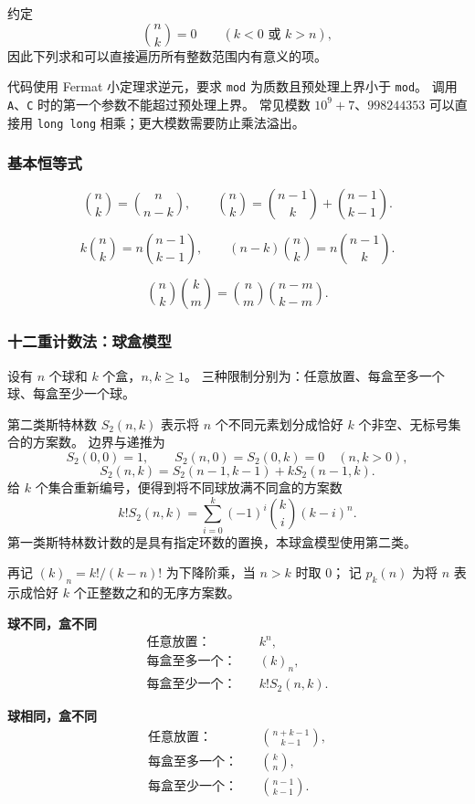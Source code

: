 约定
\[
  \binom{n}{k}=0\qquad(k<0\text{ 或 }k>n),
\]
因此下列求和可以直接遍历所有整数范围内有意义的项。

代码使用 Fermat 小定理求逆元，要求 \texttt{mod} 为质数且预处理上界小于
\texttt{mod}。
调用 \texttt{A}、\texttt{C} 时的第一个参数不能超过预处理上界。
常见模数 $10^9+7$、$998244353$ 可以直接用 \texttt{long long} 相乘；更大模数需要防止乘法溢出。

\subsubsection{基本恒等式}

\[
  \binom{n}{k}=\binom{n}{n-k},
  \qquad
  \binom{n}{k}=\binom{n-1}{k}+\binom{n-1}{k-1}.
\]

\[
  k\binom{n}{k}=n\binom{n-1}{k-1},
  \qquad
  (n-k)\binom{n}{k}=n\binom{n-1}{k}.
\]

\[
  \binom{n}{k}\binom{k}{m}
  =\binom{n}{m}\binom{n-m}{k-m}.
\]

\subsubsection{十二重计数法：球盒模型}

设有 $n$ 个球和 $k$ 个盒，$n,k\ge 1$。
三种限制分别为：任意放置、每盒至多一个球、每盒至少一个球。

第二类斯特林数 $S_2(n,k)$ 表示将 $n$ 个不同元素划分成恰好 $k$ 个非空、无标号集合的方案数。
边界与递推为
\[
  S_2(0,0)=1,
  \qquad
  S_2(n,0)=S_2(0,k)=0\quad(n,k>0),
\]
\[
  S_2(n,k)=S_2(n-1,k-1)+kS_2(n-1,k).
\]
给 $k$ 个集合重新编号，便得到将不同球放满不同盒的方案数
\[
  k!S_2(n,k)
  =\sum_{i=0}^{k}(-1)^i\binom{k}{i}(k-i)^n.
\]
第一类斯特林数计数的是具有指定环数的置换，本球盒模型使用第二类。

再记 $(k)_n=k!/(k-n)!$ 为下降阶乘，当 $n>k$ 时取 $0$；
记 $p_k(n)$ 为将 $n$ 表示成恰好 $k$ 个正整数之和的无序方案数。

\textbf{球不同，盒不同}
\[
\begin{aligned}
  \text{任意放置：}&\quad k^n,\\
  \text{每盒至多一个：}&\quad (k)_n,\\
  \text{每盒至少一个：}&\quad k!S_2(n,k).
\end{aligned}
\]

\textbf{球相同，盒不同}
\[
\begin{aligned}
  \text{任意放置：}&\quad \binom{n+k-1}{k-1},\\
  \text{每盒至多一个：}&\quad \binom{k}{n},\\
  \text{每盒至少一个：}&\quad \binom{n-1}{k-1}.
\end{aligned}
\]

